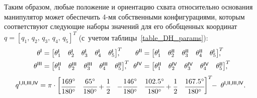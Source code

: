 Таким образом, любые положение и ориентацию схвата относительно основания манипулятор может обеспечить 4-мя собственными конфигурациями, которым соответствуют следующие наборы значений для его обобщенных координат $q=\left[q_1,\,q_2,\,q_3,\,q_4,\,q_5\right]^T$ (с~учетом таблицы~\ref{table_DH_params}):
\begin{align}
	\theta^\msf{I} &=
	\begin{bmatrix}
	    \theta_1^\msf{I} & \theta_2^\msf{I} & \theta_3^\msf{I} & \theta_4^\msf{I} & \theta_5^\msf{I}
	\end{bmatrix}^T\!\!\!\!\!,
	&
	\theta^\msf{II} &=
	\begin{bmatrix}
	    \theta_1^\msf{I} & \theta_2^\msf{II} & \theta_3^\msf{II} & \theta_4^\msf{II} & \theta_5^\msf{I}
	\end{bmatrix}^T\!\!\!\!\!,
	\\
	\theta^\msf{III} &=
	\begin{bmatrix}
	    \theta_1^\msf{II} & \theta_2^\msf{III} & \theta_3^\msf{III} & \theta_4^\msf{III} & \theta_5^\msf{II}
	\end{bmatrix}^T\!\!\!\!\!,
	&
	\theta^\msf{IV} &=
	\begin{bmatrix}
	    \theta_1^\msf{II} & \theta_2^\msf{IV} & \theta_3^\msf{IV} & \theta_4^\msf{IV} & \theta_5^\msf{II}
	\end{bmatrix}^T\!\!\!\!\!,
\end{align}
\begin{equation}
    q^{\mathsf{I,II,III,IV}} =
    \pi \cdot
    \begin{bmatrix}
	    \cfrac{169^\circ}{180^\circ} & \cfrac{65^\circ}{180^\circ} + \cfrac{1}{2} & -\cfrac{146^\circ}{180^\circ} &
	    \cfrac{102.5^\circ}{180^\circ} + \cfrac{1}{2} & \cfrac{167.5^\circ}{180^\circ}
	\end{bmatrix}^T
	\!\!- \; \theta^{\mathsf{I,II,III,IV}} \ldotp
\end{equation}

\newpage
